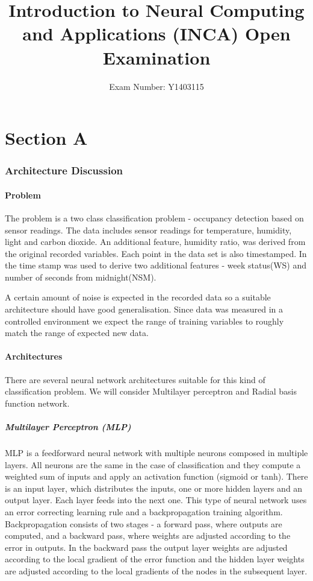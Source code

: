 \documentclass[a4paper, 11pt]{article}
\begin{document}
\title{Introduction to Neural Computing and Applications (INCA)
Open Examination}
\author{Exam Number: Y1403115}
\date{}
\maketitle


\part*{Section A}
\section{Architecture Discussion}

\subsection{Problem}
The problem is a two class classification problem - occupancy detection based on sensor readings. The data includes sensor readings for temperature, humidity, light and carbon dioxide. An additional feature, humidity ratio, was derived from the original recorded variables. Each point in the data set is also timestamped. In \cite{Candanedo2016} the time stamp was used to derive two additional features - week status(WS) and number of seconds from midnight(NSM).

A certain amount of noise is expected in the recorded data so a suitable architecture should have good generalisation. Since data was measured in a controlled environment we expect the range of training variables to roughly match the range of expected new data.

\subsection{Architectures}
There are several neural network architectures suitable for this kind of classification problem. We will consider Multilayer perceptron and Radial basis function network. 
\subsubsection{Multilayer Perceptron (MLP)}
MLP is a feedforward neural network with multiple neurons composed in multiple layers. All neurons are the same in the case of classification and they compute a weighted sum of inputs and apply an activation function (sigmoid or tanh). There is an input layer, which distributes the inputs, one or more hidden layers and an output layer. Each layer feeds into the next one. This type of neural network uses an error correcting learning rule and a backpropagation training algorithm. Backpropagation consists of two stages - a forward pass, where outputs are computed, and a backward pass, where weights are adjusted according to the error in outputs. In the backward pass the output layer weights are adjusted according to the local gradient of the error function and the hidden layer weights are adjusted according to the local gradients of the nodes in the subsequent layer. 
\end{document}
